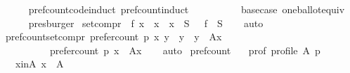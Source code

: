 \begin{isabellebody}
\ \ \ \ \isamarkupfalse%
\ pref{\isacharunderscore}{\kern0pt}count{\isacharunderscore}{\kern0pt}code{\isacharunderscore}{\kern0pt}induct\ pref{\isacharunderscore}{\kern0pt}count{\isacharunderscore}{\kern0pt}induct\isanewline
\ \ \ \ \ \ \ \ \ \ base{\isacharunderscore}{\kern0pt}case\ one{\isacharunderscore}{\kern0pt}ballot{\isacharunderscore}{\kern0pt}equiv\isanewline
\ \ \ \ \isamarkupfalse%
\ presburger\isanewline
{}\isamarkupfalse%
%
\endisatagproof
{\isafoldproof}%
%
\isadelimproof
\isanewline
%
\endisadelimproof
\isanewline
{}\isamarkupfalse%
\ set{\isacharunderscore}{\kern0pt}compr{\isacharcolon}{\kern0pt}\ {\isachardoublequoteopen}{\isacharbraceleft}{\kern0pt}\ f\ x\ {\isacharbar}{\kern0pt}\ x\ {\isachardot}{\kern0pt}\ x\ {\isasymin}\ S\ {\isacharbraceright}{\kern0pt}\ {\isacharequal}{\kern0pt}\ f\ {\isacharbackquote}{\kern0pt}\ S{\isachardoublequoteclose}\isanewline
%
\isadelimproof
\ \ %
\endisadelimproof
%
\isatagproof
{}\isamarkupfalse%
\ auto%
\endisatagproof
{\isafoldproof}%
%
\isadelimproof
\isanewline
%
\endisadelimproof
\isanewline
{}\isamarkupfalse%
\ pref{\isacharunderscore}{\kern0pt}count{\isacharunderscore}{\kern0pt}set{\isacharunderscore}{\kern0pt}compr{\isacharcolon}{\kern0pt}\ {\isachardoublequoteopen}{\isacharbraceleft}{\kern0pt}prefer{\isacharunderscore}{\kern0pt}count\ p\ x\ y\ {\isacharbar}{\kern0pt}\ y\ {\isachardot}{\kern0pt}\ y\ {\isasymin}\ A{\isacharminus}{\kern0pt}{\isacharbraceleft}{\kern0pt}x{\isacharbraceright}{\kern0pt}{\isacharbraceright}{\kern0pt}\ {\isacharequal}{\kern0pt}\isanewline
\ \ \ \ \ \ \ \ \ \ {\isacharparenleft}{\kern0pt}prefer{\isacharunderscore}{\kern0pt}count\ p\ x{\isacharparenright}{\kern0pt}\ {\isacharbackquote}{\kern0pt}\ {\isacharparenleft}{\kern0pt}A{\isacharminus}{\kern0pt}{\isacharbraceleft}{\kern0pt}x{\isacharbraceright}{\kern0pt}{\isacharparenright}{\kern0pt}{\isachardoublequoteclose}\isanewline
%
\isadelimproof
\ \ %
\endisadelimproof
%
\isatagproof
{}\isamarkupfalse%
\ auto%
\endisatagproof
{\isafoldproof}%
%
\isadelimproof
\isanewline
%
\endisadelimproof
\isanewline
{}\isamarkupfalse%
\ pref{\isacharunderscore}{\kern0pt}count{\isacharcolon}{\kern0pt}\isanewline
\ \ \ prof{\isacharcolon}{\kern0pt}\ {\isachardoublequoteopen}profile\ A\ p{\isachardoublequoteclose}\isanewline
\ \ \ x{\isacharunderscore}{\kern0pt}in{\isacharunderscore}{\kern0pt}A{\isacharcolon}{\kern0pt}\ {\isachardoublequoteopen}x\ {\isasymin}\ A{\isachardoublequoteclose}\isanewline

\end{isabellebody}
